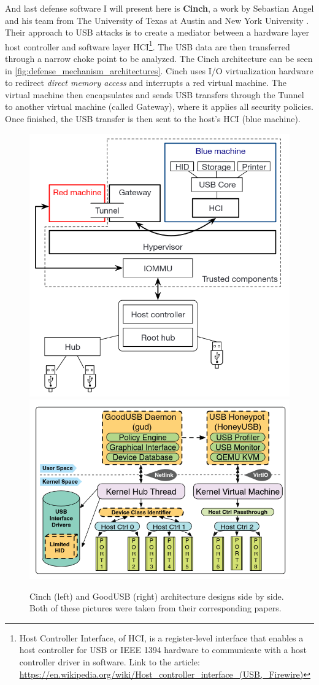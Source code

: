 And last defense software I will present here is \textbf{Cinch}, a work by Sebastian Angel and his team from The University of Texas at Austin and New York University \cite{197175}. Their approach to USB attacks is to create a mediator between a hardware layer host controller and software layer HCI\footnote{Host Controller Interface, of HCI, is a register-level interface that enables a host controller for USB or IEEE 1394 hardware to communicate with a host controller driver in software. Link to the article: \url{https://en.wikipedia.org/wiki/Host_controller_interface_(USB,_Firewire)}}. The USB data are then transferred through a narrow choke point to be analyzed. The Cinch architecture can be seen in \autoref{fig:defense_mechanism_architectures}. Cinch uses I/O virtualization hardware to redirect \emph{direct memory access} and interrupts a red virtual machine. The virtual machine then encapsulates and sends USB transfers through the Tunnel to another virtual machine (called Gateway), where it applies all security policies. Once finished, the USB transfer is then sent to the host's HCI (blue machine).
\begin{figure}[ht]
    \centering
    \includegraphics[width=0.4\linewidth]{./obrazky-figures/cinch_arch.png}
    \includegraphics[width=0.4\linewidth]{./obrazky-figures/goodusb_arch.png}
    \caption{Cinch (left)\cite{197175} and GoodUSB (right)\cite{goodusb} architecture designs side by side. Both of these pictures were taken from their corresponding papers.}
    \label{fig:defense_mechanism_architectures}
\end{figure}

